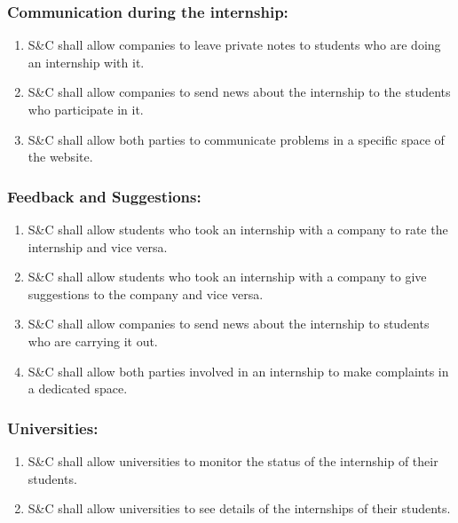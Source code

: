     \subsubsection*{Communication during the internship:}
         \begin{enumerate}[label=\textbf{R\arabic*},resume]
            \item S\&C shall allow companies to leave private notes to students who are doing an internship with it.
            \item S\&C shall allow companies to send news about the internship to the students who participate in it.
            \item S\&C shall allow both parties to communicate problems in a specific space of the website.
        \end{enumerate}
    
    \subsubsection*{Feedback and Suggestions:}
        \begin{enumerate}[label=\textbf{R\arabic*},resume]
            \item S\&C shall allow students who took an internship with a company to rate the internship and vice versa.
            \item S\&C shall allow students who took an internship with a company to give suggestions to the company and vice versa.
            \item S\&C shall allow companies to send news about the internship to students who are carrying it out.
            \item S\&C shall allow both parties involved in an internship to make complaints in a dedicated space.
        \end{enumerate}
        
    \subsubsection*{Universities:}
        \begin{enumerate}[label=\textbf{R\arabic*},resume]
            \item S\&C shall allow universities to monitor the status of the internship of their students.
            \item S\&C shall allow universities to see details of the internships of their students.
        \end{enumerate}
        
